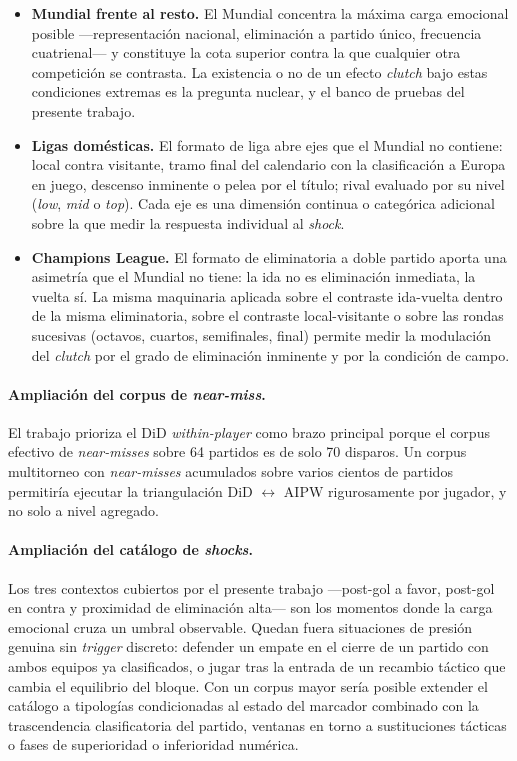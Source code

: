 \begin{itemize}
  \item \textbf{Mundial frente al resto.} El Mundial concentra la
    máxima carga emocional posible ---representación nacional,
    eliminación a partido único, frecuencia cuatrienal--- y constituye
    la cota superior contra la que cualquier otra competición se
    contrasta. La existencia o no de un efecto \textit{clutch} bajo
    estas condiciones extremas es la pregunta nuclear, y el banco
    de pruebas del presente trabajo.
  \item \textbf{Ligas domésticas.} El formato de liga abre ejes que
    el Mundial no contiene: local contra visitante, tramo final del
    calendario con la clasificación a Europa en juego, descenso
    inminente o pelea por el título; rival evaluado por su nivel
    (\textit{low}, \textit{mid} o \textit{top}). Cada eje es una
    dimensión continua o categórica adicional sobre la que medir la
    respuesta individual al \textit{shock}.
  \item \textbf{Champions League.} El formato de eliminatoria a doble
    partido aporta una asimetría que el Mundial no tiene: la ida no
    es eliminación inmediata, la vuelta sí. La misma maquinaria
    aplicada sobre el contraste ida-vuelta dentro de la misma
    eliminatoria, sobre el contraste local-visitante o sobre las
    rondas sucesivas (octavos, cuartos, semifinales, final) permite
    medir la modulación del \textit{clutch} por el grado de
    eliminación inminente y por la condición de campo.
\end{itemize}

\paragraph{Ampliación del corpus de \textit{near-miss}.}
El trabajo prioriza el DiD \textit{within-player} como brazo
principal porque el corpus efectivo de \textit{near-misses} sobre
64 partidos es de solo 70 disparos. Un corpus multitorneo con
\textit{near-misses} acumulados sobre varios cientos de partidos
permitiría ejecutar la triangulación DiD $\leftrightarrow$ AIPW
rigurosamente por jugador, y no solo a nivel agregado.

\paragraph{Ampliación del catálogo de \textit{shocks}.}
Los tres contextos cubiertos por el presente trabajo ---post-gol a
favor, post-gol en contra y proximidad de eliminación alta--- son
los momentos donde la carga emocional cruza un umbral observable.
Quedan fuera situaciones de presión genuina sin \textit{trigger}
discreto: defender un empate en el cierre de un partido con ambos
equipos ya clasificados, o jugar tras la entrada de un recambio
táctico que cambia el equilibrio del bloque. Con un corpus mayor
sería posible extender el catálogo a tipologías condicionadas al
estado del marcador combinado con la trascendencia clasificatoria
del partido, ventanas en torno a sustituciones tácticas o fases de
superioridad o inferioridad numérica.


